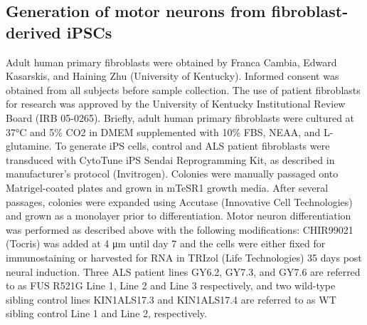 \subsection{Generation of motor neurons from fibroblast-derived iPSCs}
Adult human primary fibroblasts were obtained by Franca Cambia, Edward Kasarskis, and Haining Zhu (University of Kentucky). Informed consent was obtained from all subjects before sample collection. The use of patient fibroblasts for research was approved by the University of Kentucky Institutional Review Board (IRB 05-0265). Briefly, adult human primary fibroblasts were cultured at 37°C and 5\% CO2 in DMEM supplemented with 10\% FBS, NEAA, and L-glutamine. To generate iPS cells, control and ALS patient fibroblasts were transduced with CytoTune iPS Sendai Reprogramming Kit, as described in manufacturer’s protocol (Invitrogen). Colonies were manually passaged onto Matrigel-coated plates and grown in mTeSR1 growth media. After several passages, colonies were expanded using Accutase (Innovative Cell Technologies) and grown as a monolayer prior to differentiation. Motor neuron differentiation was performed as described above with the following modifications: CHIR99021 (Tocris) was added at 4 μm until day 7 and the cells were either fixed for immunostaining or harvested for RNA in TRIzol (Life Technologies) 35 days post neural induction. Three ALS patient lines GY6.2, GY7.3, and GY7.6 are referred to as FUS R521G Line 1, Line 2 and Line 3 respectively, and two wild-type sibling control lines KIN1ALS17.3 and KIN1ALS17.4 are referred to as WT sibling control Line 1 and Line 2, respectively.

